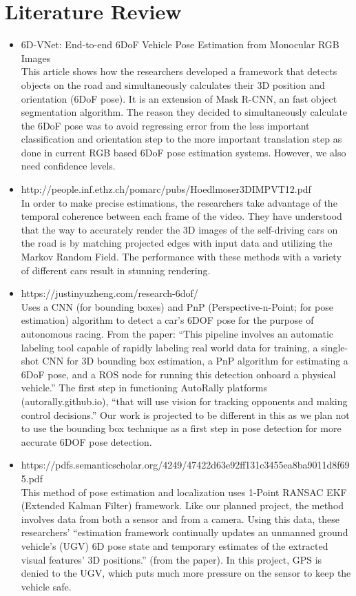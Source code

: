\documentclass{article}
\begin{document}
\section{Literature Review}
\begin{itemize}
    \item 6D-VNet: End-to-end 6DoF Vehicle Pose Estimation from Monocular RGB Images \\
This article shows how the researchers developed a framework that detects objects on the road and simultaneously calculates their 3D position and orientation (6DoF pose). It is an extension of Mask R-CNN, an fast object segmentation algorithm. The reason they decided to simultaneously calculate the 6DoF pose was to avoid regressing error from the less important classification and orientation step to the more important translation step as done in current RGB based 6DoF pose estimation systems. However, we also need confidence levels.

    \item http://people.inf.ethz.ch/pomarc/pubs/Hoedlmoser3DIMPVT12.pdf \\
In order to make precise estimations, the researchers take advantage of the temporal coherence between each frame of the video. They have understood that the way to accurately render the 3D images of the self-driving cars on the road is by matching projected edges with input data and utilizing the Markov Random Field. The performance with these methods with a variety of different cars result in stunning rendering. 

    \item https://justinyuzheng.com/research-6dof/ \\
Uses a CNN (for bounding boxes) and PnP (Perspective-n-Point; for pose estimation) algorithm to detect a car’s 6DOF pose for the purpose of autonomous racing. From the paper: “This pipeline involves an automatic labeling tool capable of rapidly labeling real world data for training, a single-shot CNN for 3D bounding box estimation, a PnP algorithm for estimating a 6DoF pose, and a ROS node for running this detection onboard a physical vehicle.” The first step in functioning AutoRally platforms (autorally.github.io), “that will use vision for tracking opponents and making control decisions.” Our work is projected to be different in this as we plan not to use the bounding box technique as a first step in pose detection for more accurate 6DOF pose detection.

    \item https://pdfs.semanticscholar.org/4249/47422d63e92ff131c3455ea8ba9011d8f695.pdf \\
This method of pose estimation and localization uses 1-Point RANSAC EKF (Extended Kalman Filter) framework. Like our planned project, the method involves data from both a sensor and from a camera. Using this data, these researchers’ “estimation framework continually updates an unmanned ground vehicle’s (UGV) 6D pose state and temporary estimates of the extracted visual features’ 3D positions.” (from the paper). In this project, GPS is denied to the UGV, which puts much more pressure on the sensor to keep the vehicle safe.


\end{itemize}
\end{document}
